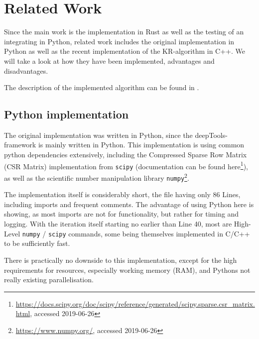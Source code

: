 \chapter{Related Work}\label{chap:relatedwork}

Since the main work is the implementation in Rust as well as the testing of an
integrating in Python, related work includes the original implementation in
Python as well as the recent implementation of the KR-algorithm in C++.
We will take a look at how they have been implemented, advantages and
disadvantages.

 The description of the implemented algorithm can be found in .


\section{Python implementation}\label{sec:python}




The original implementation was written in Python, since the
deepTools-framework is mainly written in Python. This implementation is using
common python dependencies extensively, including the Compressed Sparse Row
Matrix (CSR Matrix) implementation from \verb|scipy| (documentation can be
found
here\footnote{\url{https://docs.scipy.org/doc/scipy/reference/generated/scipy.sparse.csr_matrix.html},
accessed 2019-06-26}), as well as the scientific number manipulation library
\verb|numpy|\footnote{\url{https://www.numpy.org/}, accessed 2019-06-26}.

The implementation itself is considerably short, the file having only 86 Lines,
including imports and frequent comments. The advantage of using Python here is
showing, as most imports are not for functionality, but rather for timing and
logging. With the iteration itself starting no earlier than Line 40, most
are High-Level \verb|numpy| / \verb|scipy| commands, some being themselves
implemented in C/C++ to be sufficiently fast.

There is practically no downside to this implementation, except for the high
requirements for resources, especially working memory (RAM), and Pythons not really existing parallelisation.

